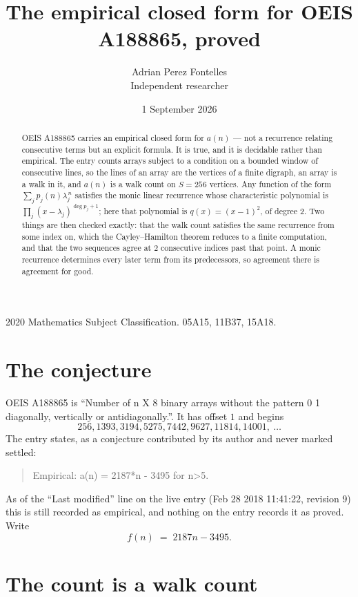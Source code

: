 \documentclass[11pt,a4paper]{article}
\title{The empirical closed form for OEIS A188865, proved}
\author{Adrian Perez Fontelles\\ \small Independent researcher}
\date{1 September 2026}
\theoremstyle{plain}
\theoremstyle{definition}
\begin{document}
\maketitle

\begin{abstract}
OEIS A188865 carries an empirical closed form for $a(n)$ --- not a recurrence relating
consecutive terms but an explicit formula. It is true, and it is decidable rather than
empirical. The entry counts arrays subject to a condition on a bounded window of consecutive lines, so the lines of an array are the
vertices of a finite digraph, an array is a walk in it, and $a(n)$ is a walk count on
$S=256$ vertices. Any function of the form $\sum_j p_j(n)\lambda_j^{\,n}$ satisfies the
monic linear recurrence whose characteristic polynomial is
$\prod_j(x-\lambda_j)^{\deg p_j+1}$; here that polynomial is $q(x)=(x-1)^{2}$, of degree
$2$. Two things are then checked exactly: that the walk count satisfies the same
recurrence from some index on, which the Cayley--Hamilton theorem reduces to a finite
computation, and that the two sequences agree at $2$ consecutive indices past that
point. A monic recurrence determines every later term from its predecessors, so agreement
there is agreement for good.
\end{abstract}

\noindent\small 2020 Mathematics Subject Classification. 05A15, 11B37, 15A18.\normalsize

\section{The conjecture}

OEIS A188865 is ``Number of n X 8 binary arrays without the pattern 0 1 diagonally, vertically or antidiagonally.''. It has offset $1$ and begins
\[
256, 1393, 3194, 5275, 7442, 9627, 11814, 14001,\ \dots
\]
The entry states, as a conjecture contributed by its author and never marked settled:
\begin{quote}
Empirical: a(n) = 2187*n - 3495 for n>5.
\end{quote}
As of the ``Last modified'' line on the live entry (Feb 28 2018 11:41:22, revision 9) this is still
recorded as empirical, and nothing on the entry records it as proved. Write
\[
f(n)\;=\;2187 n - 3495.
\]

\section{The count is a walk count}
\end{document}
